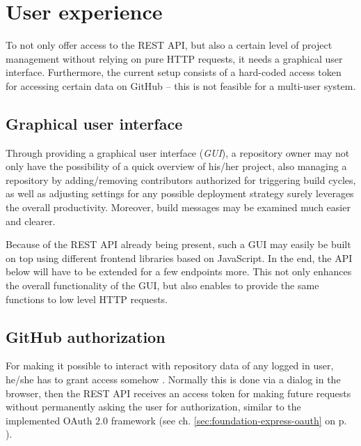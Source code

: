 \section{User experience}
\label{sec:userexperience}

To not only offer access to the REST API, but also a certain level of project management without relying on pure HTTP requests, it needs a graphical user interface. Furthermore, the current setup consists of a hard-coded access token for accessing certain data on GitHub -- this is not feasible for a multi-user system.

\subsection{Graphical user interface}
Through providing a graphical user interface (\emph{GUI}), a repository owner may not only have the possibility of a quick overview of his/her project, also managing a repository by adding/removing contributors authorized for triggering build cycles, as well as adjusting settings for any possible deployment strategy surely leverages the overall productivity. Moreover, build messages may be examined much easier and clearer.

Because of the REST API already being present, such a GUI may easily be built on top using different frontend libraries based on JavaScript. In the end, the API below will have to be extended for a few endpoints more. This not only enhances the overall functionality of the GUI, but also enables to provide the same functions to low level HTTP requests.

\subsection{GitHub authorization}
For making it possible to interact with repository data of any logged in user, he/she has to grant access somehow \cite{GithubAuthentication}. Normally this is done via a dialog in the browser, then the REST API receives an access token for making future requests without permanently asking the user for authorization, similar to the implemented OAuth 2.0 framework (see ch. \ref{sec:foundation-express-oauth} on p. \pageref{sec:foundation-express-oauth}).
